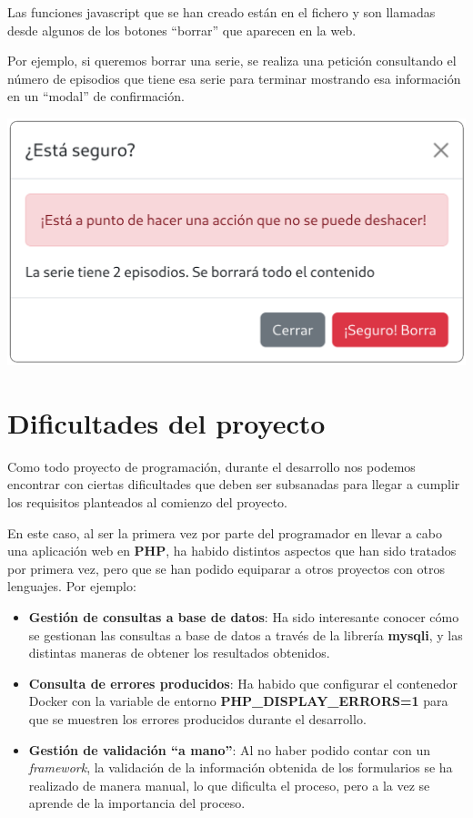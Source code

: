 \documentclass{\ClassPath/viu-tfm-template}
\begin{document}
Las funciones javascript que se han creado están en el fichero  y son llamadas desde algunos de los botones “borrar” que aparecen en la web.

Por ejemplo, si queremos borrar una serie, se realiza una petición consultando el número de episodios que tiene esa serie para terminar mostrando esa información en un “modal” de confirmación.

\vspace{-1em}
\begin{center}
    \includegraphics[width=0.5\linewidth]{img/modal.png}
\end{center}
\vspace{-1.5em}


\chapter{Dificultades del proyecto}

Como todo proyecto de programación, durante el desarrollo nos podemos encontrar con ciertas dificultades que deben ser subsanadas para llegar a cumplir los requisitos planteados al comienzo del proyecto.

En este caso, al ser la primera vez por parte del programador en llevar a cabo una aplicación web en \textbf{PHP}, ha habido distintos aspectos que han sido tratados por primera vez, pero que se han podido equiparar a otros proyectos con otros lenguajes. Por ejemplo:

\vspace{-1em}
\begin{itemize}
    \item \textbf{Gestión de consultas a base de datos}: Ha sido interesante conocer cómo se gestionan las consultas a base de datos a través de la librería \textbf{mysqli}, y las distintas maneras de obtener los resultados obtenidos.
    \item \textbf{Consulta de errores producidos}: Ha habido que configurar el contenedor Docker con la variable de entorno \textbf{PHP\_DISPLAY\_ERRORS=1} para que se muestren los errores producidos durante el desarrollo.
    \item \textbf{Gestión de validación “a mano”}: Al no haber podido contar con un \textit{framework}, la validación de la información obtenida de los formularios se ha realizado de manera manual, lo que dificulta el proceso, pero a la vez se aprende de la importancia del proceso.
\end{itemize}
\end{document}
